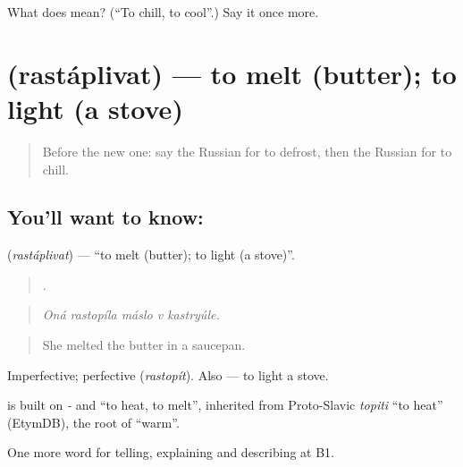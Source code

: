 \begin{tcolorbox}[breakable,colback=teal!4,colframe=teal!35!black,title={Before you move on}]
What does  mean? (\textquotedblleft{}To chill, to cool\textquotedblright{}.) Say it once more.
\end{tcolorbox}
\section[\texorpdfstring{\ru{растапливать} (rastáplivat)}{растапливать (rastáplivat)}]{ (rastáplivat) — to melt (butter); to light (a stove)}

\label{lesson:RU-C335-rastaplivat}



\begin{quote}
Before the new one: say the Russian for to defrost, then the Russian for to chill.
\end{quote}

\subsection*{You'll want to know: }
\textbf{} (\emph{rastáplivat}) — \textquotedblleft{}to melt (butter); to light (a stove)\textquotedblright{}.

\begin{quote}
    .
\end{quote}

\begin{quote}
\emph{Oná rastopíla máslo v kastryúle.}
\end{quote}

\begin{quote}
She melted the butter in a saucepan.
\end{quote}

Imperfective; perfective \emph{} (\emph{rastopít}). Also \emph{ } — to light a stove.

\begin{cousinweb}
\emph{} is built on \emph{-} and \emph{} \textquotedblleft{}to heat, to melt\textquotedblright{}, inherited from Proto-Slavic \emph{topiti} \textquotedblleft{}to heat\textquotedblright{} (EtymDB), the root of \emph{} \textquotedblleft{}warm\textquotedblright{}.
\end{cousinweb}

\begin{grammarlens}[title={What you've built}]
One more word for telling, explaining and describing at B1.
\end{grammarlens}

